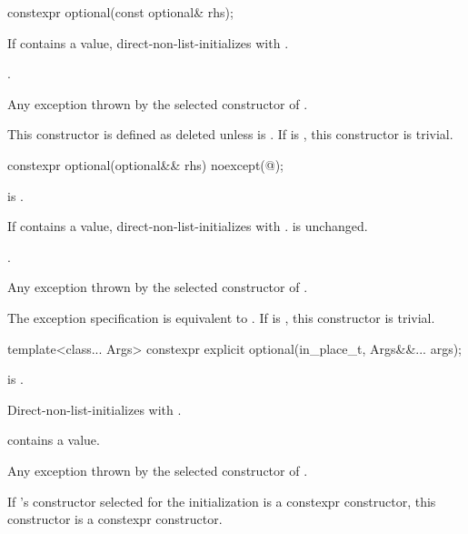 %
\begin{itemdecl}
constexpr optional(const optional& rhs);
\end{itemdecl}

\begin{itemdescr}
\begin{addedblock}

\end{addedblock}

\pnum
\effects
If  contains a value, direct-non-list-initializes  with .

\pnum
\ensures
{}.

\pnum
\throws
Any exception thrown by the selected constructor of .

\pnum
\remarks
This constructor is defined as deleted unless  is . If  is , this constructor is trivial.
\end{itemdescr}

%
\begin{itemdecl}
constexpr optional(optional&& rhs) noexcept(@\seebelow@);
\end{itemdecl}

\begin{itemdescr}
\pnum
\constraints
{} is .

\pnum
\effects
If  contains a value, direct-non-list-initializes  with .  is unchanged.

\pnum
\ensures
{}.

\pnum
\throws
Any exception thrown by the selected constructor of .

\pnum
\remarks
The exception specification is equivalent to . If  is , this constructor is trivial.
\end{itemdescr}

%
\begin{itemdecl}
template<class... Args>
  constexpr explicit optional(in_place_t, Args&&... args);
\end{itemdecl}

\begin{itemdescr}
\pnum
\constraints
{} is .

\pnum
\effects
Direct-non-list-initializes  with .

\pnum
\ensures
{} contains a value.

\pnum
\throws
Any exception thrown by the selected constructor of .

\pnum
\remarks
If 's constructor selected for the initialization is a constexpr constructor, this constructor is a constexpr constructor.
\end{itemdescr}

